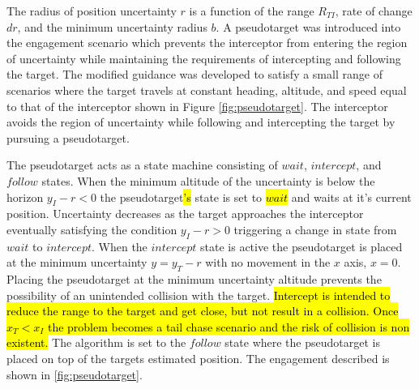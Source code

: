 \documentclass[conference]{IEEEtran}
\begin{document}
The radius of position uncertainty $r$ is a function of the range $R_{TI}$, rate of change $dr$, and the minimum uncertainty radius $b$. A pseudotarget was introduced into the engagement scenario which prevents the interceptor from entering the region of uncertainty while maintaining the requirements of intercepting and following the target. The modified guidance was developed to satisfy a small range of scenarios where the target travels at constant heading, altitude, and speed equal to that of the interceptor shown in Figure \ref{fig:pseudotarget}. The interceptor avoids the region of uncertainty while following and intercepting the target by pursuing a pseudotarget. 



The pseudotarget acts as a state machine consisting of $wait$, $intercept$, and $follow$ states. When the minimum altitude of the uncertainty is below the horizon $y_I-r<0$ the pseudotarget\hl{'s} state is set to \hl{$wait$} and waits at it's current position. Uncertainty decreases as the target approaches the interceptor eventually satisfying the condition $y_I-r >0$ triggering a change in state from $wait$ to $intercept$. When the $intercept$ state is active the pseudotarget is placed at the minimum uncertainty $y=y_T-r$ with no movement in the $x$ axis, $x=0$. Placing the pseudotarget at the minimum uncertainty altitude prevents the possibility of an unintended collision with the target. \hl{Intercept is intended to reduce the range to the target and get close, but not result in a collision. Once $x_T<x_I$ the problem becomes a tail chase scenario and the risk of collision is non existent.} The algorithm is set to the $follow$ state where the pseudotarget is placed on top of the targets estimated position. The engagement described is shown in \ref{fig:pseudotarget}.






\end{document}
